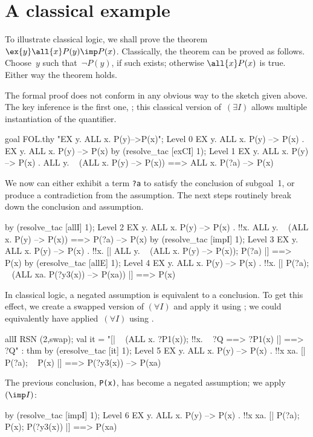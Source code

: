 \section{A classical example} \label{fol-cla-example}
To illustrate classical logic, we shall prove the theorem
$\ex{y}\all{x}P(y)\imp P(x)$.  Classically, the theorem can be proved as
follows.  Choose~$y$ such that~$\neg P(y)$, if such exists; otherwise
$\all{x}P(x)$ is true.  Either way the theorem holds.

The formal proof does not conform in any obvious way to the sketch given
above.  The key inference is the first one, ; this classical
version of~$(\exists I)$ allows multiple instantiation of the quantifier.
\begin{ttbox}
goal FOL.thy "EX y. ALL x. P(y)-->P(x)";
{\out Level 0}
{\out EX y. ALL x. P(y) --> P(x)}
{. EX y. ALL x. P(y) --> P(x)}
\ttbreak
by (resolve_tac [exCI] 1);
{\out Level 1}
{\out EX y. ALL x. P(y) --> P(x)}
{. ALL y. ~ (ALL x. P(y) --> P(x)) ==> ALL x. P(?a) --> P(x)}
\end{ttbox}
We now can either exhibit a term {\tt?a} to satisfy the conclusion of
subgoal~1, or produce a contradiction from the assumption.  The next
steps routinely break down the conclusion and assumption.
\begin{ttbox}
by (resolve_tac [allI] 1);
{\out Level 2}
{\out EX y. ALL x. P(y) --> P(x)}
{. !!x. ALL y. ~ (ALL x. P(y) --> P(x)) ==> P(?a) --> P(x)}
\ttbreak
by (resolve_tac [impI] 1);
{\out Level 3}
{\out EX y. ALL x. P(y) --> P(x)}
{. !!x. [| ALL y. ~ (ALL x. P(y) --> P(x)); P(?a) |] ==> P(x)}
\ttbreak
by (eresolve_tac [allE] 1);
{\out Level 4}
{\out EX y. ALL x. P(y) --> P(x)}
{. !!x. [| P(?a); ~ (ALL xa. P(?y3(x)) --> P(xa)) |] ==> P(x)}
\end{ttbox}
In classical logic, a negated assumption is equivalent to a conclusion.  To
get this effect, we create a swapped version of $(\forall I)$ and apply it
using ; we could equivalently have applied~$(\forall
I)$ using .
\begin{ttbox}
allI RSN (2,swap);
{\out val it = "[| ~ (ALL x. ?P1(x)); !!x. ~ ?Q ==> ?P1(x) |] ==> ?Q" : thm}
by (eresolve_tac [it] 1);
{\out Level 5}
{\out EX y. ALL x. P(y) --> P(x)}
{. !!x xa. [| P(?a); ~ P(x) |] ==> P(?y3(x)) --> P(xa)}
\end{ttbox}
The previous conclusion, {\tt P(x)}, has become a negated assumption;
we apply~$({\imp}I)$:
\begin{ttbox}
by (resolve_tac [impI] 1);
{\out Level 6}
{\out EX y. ALL x. P(y) --> P(x)}
{. !!x xa. [| P(?a); ~ P(x); P(?y3(x)) |] ==> P(xa)}
\end{ttbox}
